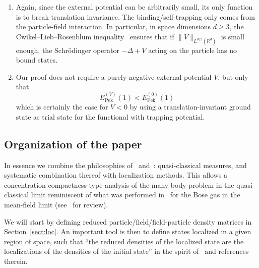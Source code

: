 \documentclass[AHL,Unicode,longabstracts,published]{cedram}
\DeclareMathOperator{\Pek}{Pek}
\newcommand{\R}{\mathbb{R}}
\newcommand{\cN}{\mathcal{N}}
\newcommand{\1}{\mathds{1}}
\let\originalleft\left
\let\originalright\right
\renewcommand{\left}{\mathopen{}\mathclose\bgroup\originalleft}
\renewcommand{\right}{\aftergroup\egroup\originalright}
\begin{document}
\begin{enumerate}
\begin{equation*}
\left\langle \Psi_\alpha \,|\, \cN^\kappa \Psi_\alpha \right\rangle \leq C_\kappa
\end{equation*}
independently of $\alpha$, we can allow for $k+\ell \leq 2 \kappa$ in the main result. If $\Psi_\alpha$ is a true eigenstate of the Hamiltonian (assuming such exist), estimates of this form follow from the variational equation and so-called pull-through formulae~\cite{Ammari-00,Rosen-71}.
\item\label{commenttheo2.3.4} Again, since the external potential can be arbitrarily small, its only function is to break translation invariance. The binding/self-trapping only comes from the particle-field interaction. In particular, in space dimensions $d\geq 3$, the Cwikel--Lieb--Rosenblum inequality~\cite[Chapter~4 and references therein]{LieSei-09} ensures that if $\| V\|_{L^{d/2} (\R^d)}$ is small enough, the Schr\"odinger operator $-\Delta + V$ acting on the particle has no bound states.
\item\label{commenttheo2.3.5} Our proof does not require a purely negative external potential $V$, but only that
\begin{equation*}
E_{\Pek}^{(V)}(1) < E_{\Pek}^{(0)}(1)
\end{equation*}
which is certainly the case for $V < 0$ by using a translation-invariant ground state as trial state for the functional with trapping potential.
\end{enumerate}



\subsection{Organization of the paper}

In essence we combine the philosophies of~\cite{CorFalOli-20} and~\cite{LewNamRou-14,LewNamRou-14d}: quasi-classical measures, and systematic combination thereof with localization methods. This allows a concentration-compactness-type analysis of the many-body problem in the quasi-classical limit reminiscent of what was performed in~\cite{LewNamRou-14} for the Bose gas in the mean-field limit (see~\cite{Rougerie-LMU,Rougerie-EMS} for review).

We will start by defining reduced particle/field/field-particle density matrices in Section~\ref{sect:loc}. An important tool is then to define states localized in a given region of space, such that ``the reduced densities of the localized state are the localizations of the densities of the initial state'' in the spirit of~\cite{Lewin-11} and references therein.
\end{document}
